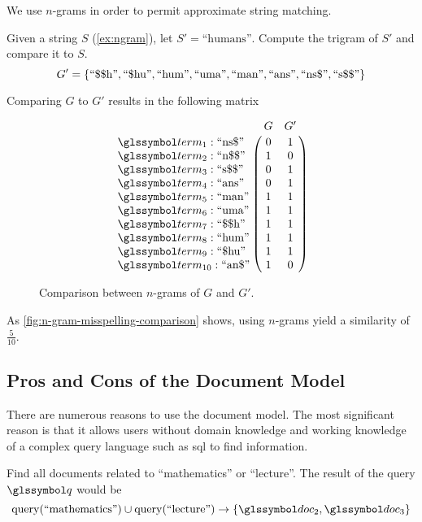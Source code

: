 		We use \(n\)-grams in order to permit approximate string matching.
		
		\begin{ex}
		\label{ex:n-gram-comparison}
			Given a string \(S\) (\vref{ex:ngram}), let \(S' = \text{``humans''}\).  Compute the trigram of \(S'\) and compare it to \(S\).
			\[
				G' = \{
					\text{``\char"24\char"24h''},
					\text{``\char"24hu''},
					\text{``hum''},
					\text{``uma''},
					\text{``man''},
					\text{``ans''},
					\text{``ns\char"24''},
					\text{``s\char"24\char"24''}
				\}
			\]
			
			Comparing \(G\) to \(G'\) results in the following matrix
			
			\begin{figure}
				\[
					\bordermatrix{
						~ & G & G' \cr
						\term_{1} : \text{``ns\char"24''} & 0 & 1 \cr
						\term_{2} : \text{``n\char"24\char"24''} & 1 & 0 \cr
						\term_{3} : \text{``s\char"24\char"24''} & 0 & 1 \cr
						\term_{4} : \text{``ans''} & 0 & 1 \cr
						\term_{5} : \text{``man''} & 1 & 1 \cr
						\term_{6} : \text{``uma''} & 1 & 1 \cr
						\term_{7} : \text{``\char"24\char"24h''} & 1 & 1 \cr
						\term_{8} : \text{``hum''} & 1 & 1 \cr
						\term_{9} : \text{``\char"24hu''} & 1 & 1 \cr
						\term_{10} : \text{``an\char"24''} & 1 & 0 \cr
					}
				\]
				
				\caption{Comparison between \(n\)-grams of \(G\) and \(G'\).}
				\label{fig:n-gram-misspelling-comparison}
			\end{figure}
			
			As \vref{fig:n-gram-misspelling-comparison} shows, using \(n\)-grams yield a similarity of \(\frac{5}{10}\).
		\end{ex}
			
	\subsection{Pros and Cons of the Document Model}
	\label{sec:pros-cons-document-model}
		There are numerous reasons to use the document model.  The most significant reason is that it allows users without domain knowledge and working knowledge of a complex query language such as \gls{sql} to find information.
		
		\begin{ex}
			Find all documents related to ``mathematics'' or ``lecture''.  The result of the query \(\q\) would be
			\[
				\query(\text{``mathematics''}) \cup \query(\text{``lecture''}) \rightarrow \{\doc_2, \doc_3\}
			\]
		\end{ex}
		
